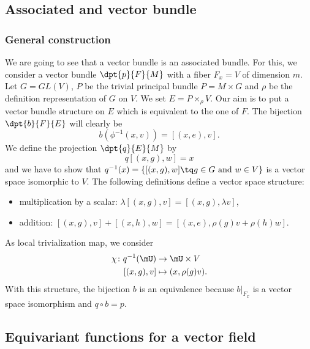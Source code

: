 	\subsection{Associated and vector bundle}

	\subsubsection{General construction}

	We are going to see that a vector bundle is an associated bundle. For this, we consider a vector bundle $\dpt{p}{F}{M}$ with a fiber $F_x=V$ of dimension $m$. Let $G=GL(V)$, $P$ be the trivial principal bundle $P=M\times G$ and $\rho$ be the definition representation of $G$ on $V$. We set $E=P\times_{\rho} V$. Our aim is to put a vector bundle structure on $E$ which is equivalent to the one of $F$. The bijection $\dpt{b}{F}{E}$ will clearly be
	\begin{equation}
	b(\phi^{-1}(x,v))=[(x,e),v].
	\end{equation}
	We define the projection $\dpt{q}{E}{M}$ by
	\[
		q[(x,g),w]=x
		\]
		and we have to show that  $q^{-1}(x)=\{  [(x,g),w]\tq g\in G \textrm{ and } w\in V  \}$ is a vector space isomorphic to $V$. The following definitions define a vector space structure:
		\begin{itemize}
		\item multiplication by a scalar: $\lambda[(x,g),v]=[(x,g),\lambda v]$,
		\item addition: $[(x,g),v]+[(x,h),w]=[(x,e),\rho(g)v+\rho(h)w]$.
		\end{itemize}
		As local trivialization map, we consider
		\begin{equation}
		\begin{aligned}
		\chi\colon q^{-1}(\mU) & \to \mU\times V      \\
			[(x,g),v]              & \mapsto(x,\rho(g)v).
			\end{aligned}
			\end{equation}
			With this structure, the bijection $b$ is an equivalence because $b|_{F_x}$ is a vector space isomorphism and $q\circ b=p$.

			\subsection{Equivariant functions for a vector field}	\label{equivvec}

